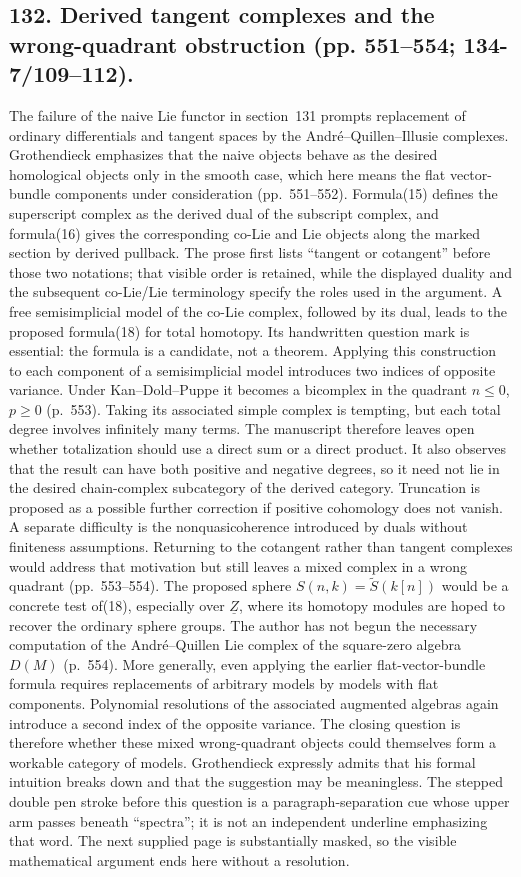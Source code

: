 \documentclass[10pt,oneside]{book}
\begin{document}
\subsection*{132. Derived tangent complexes and the wrong-quadrant obstruction (pp. 551--554; 134-7/109--112).}
The failure of the naive Lie functor in section~131 prompts replacement of ordinary differentials and tangent spaces by the Andr\'e--Quillen--Illusie complexes. Grothendieck emphasizes that the naive objects behave as the desired homological objects only in the smooth case, which here means the flat vector-bundle components under consideration (pp.~551--552). Formula(15) defines the superscript complex as the derived dual of the subscript complex, and formula(16) gives the corresponding co-Lie and Lie objects along the marked section by derived pullback. The prose first lists ``tangent or cotangent'' before those two notations; that visible order is retained, while the displayed duality and the subsequent co-Lie/Lie terminology specify the roles used in the argument. A free semisimplicial model of the co-Lie complex, followed by its dual, leads to the proposed formula(18) for total homotopy. Its handwritten question mark is essential: the formula is a candidate, not a theorem. Applying this construction to each component of a semisimplicial model introduces two indices of opposite variance. Under Kan--Dold--Puppe it becomes a bicomplex in the quadrant $n\leq0$, $p\geq0$ (p.~553). Taking its associated simple complex is tempting, but each total degree involves infinitely many terms. The manuscript therefore leaves open whether totalization should use a direct sum or a direct product. It also observes that the result can have both positive and negative degrees, so it need not lie in the desired chain-complex subcategory of the derived category. Truncation is proposed as a possible further correction if positive cohomology does not vanish. A separate difficulty is the nonquasicoherence introduced by duals without finiteness assumptions. Returning to the cotangent rather than tangent complexes would address that motivation but still leaves a mixed complex in a wrong quadrant (pp.~553--554). The proposed sphere $S(n,k)=\widetilde S(k[n])$ would be a concrete test of(18), especially over $\underline Z$, where its homotopy modules are hoped to recover the ordinary sphere groups. The author has not begun the necessary computation of the Andr\'e--Quillen Lie complex of the square-zero algebra $D(M)$ (p.~554). More generally, even applying the earlier flat-vector-bundle formula requires replacements of arbitrary models by models with flat components. Polynomial resolutions of the associated augmented algebras again introduce a second index of the opposite variance. The closing question is therefore whether these mixed wrong-quadrant objects could themselves form a workable category of models. Grothendieck expressly admits that his formal intuition breaks down and that the suggestion may be meaningless. The stepped double pen stroke before this question is a paragraph-separation cue whose upper arm passes beneath ``spectra''; it is not an independent underline emphasizing that word. The next supplied page is substantially masked, so the visible mathematical argument ends here without a resolution.
\end{document}
